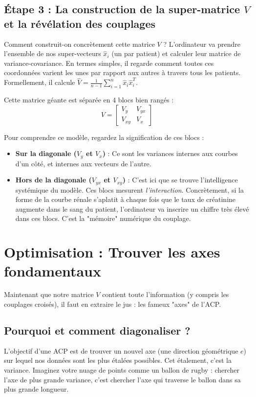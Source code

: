 \documentclass[11pt, a4paper]{article}
\begin{document}
\subsection{Étape 3 : La construction de la super-matrice $V$ et la révélation des couplages}
Comment construit-on concrètement cette matrice $V$ ? L'ordinateur va prendre l'ensemble de nos super-vecteurs $\hat{x}_i$ (un par patient) et calculer leur matrice de variance-covariance. En termes simples, il regarde comment toutes ces coordonnées varient les unes par rapport aux autres à travers tous les patients. Formellement, il calcule $\hat{V} = \frac{1}{n-1} \sum_{i=1}^n \hat{x}_i \hat{x}_i^T$.

Cette matrice géante est séparée en 4 blocs bien rangés :
\begin{equation}
V = \begin{bmatrix} V_y & V_{yx} \\ V_{xy} & V_x \end{bmatrix}
\end{equation}

Pour comprendre ce modèle, regardez la signification de ces blocs :
\begin{itemize}
    \item \textbf{Sur la diagonale ($V_y$ et $V_x$)} : Ce sont les variances internes aux courbes d'un côté, et internes aux vecteurs de l'autre.
    \item \textbf{Hors de la diagonale ($V_{yx}$ et $V_{xy}$)} : C'est ici que se trouve l'intelligence systémique du modèle. Ces blocs mesurent \textit{l'interaction}. Concrètement, si la forme de la courbe rénale s'aplatit à chaque fois que le taux de créatinine augmente dans le sang du patient, l'ordinateur va inscrire un chiffre très élevé dans ces blocs. C'est la "mémoire" numérique du couplage.
\end{itemize}

\section{Optimisation : Trouver les axes fondamentaux}

Maintenant que notre matrice $V$ contient toute l'information (y compris les couplages croisés), il faut en extraire le jus : les fameux "axes" de l'ACP.

\subsection{Pourquoi et comment diagonaliser ?}
L'objectif d'une ACP est de trouver un nouvel axe (une direction géométrique $e$) sur lequel nos données sont les plus étalées possibles. Cet étalement, c'est la variance. Imaginez votre nuage de points comme un ballon de rugby : chercher l'axe de plus grande variance, c'est chercher l'axe qui traverse le ballon dans sa plus grande longueur.
\end{document}
